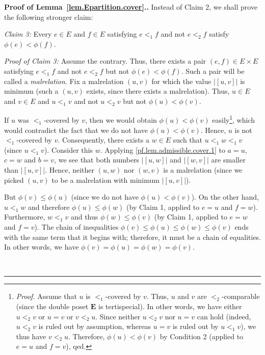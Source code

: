 \documentclass[numbers=enddot,12pt,final,onecolumn,notitlepage,abstracton]{scrartcl}
\theoremstyle{definition}
\newenvironment{proof}[1][Proof]{\noindent\textbf{#1.} }{\ \rule{0.5em}{0.5em}}
\newcommand{\EE}{{\mathbf{E}}}
\begin{document}
\begin{proof}[Proof of Lemma~\ref{lem.Epartition.cover}.]
Instead of Claim 2, we shall prove the following stronger claim:

\textit{Claim 3:} Every $e \in E$ and $f \in E$ satisfying
$e <_1 f$ and not $e <_2 f$ satisfy
$\phi\left(e\right) < \phi\left(f\right)$.

\textit{Proof of Claim 3:} Assume the contrary. Thus, there
exists a pair $\left(e, f\right) \in E \times E$ satisfying
$e <_1 f$ and not $e <_2 f$ but not
$\phi\left(e\right) < \phi\left(f\right)$.
Such a pair will be called a \textit{malrelation}. Fix a
malrelation $\left(u, v\right)$ for which the value
$\left|\left[u, v\right]\right|$ is minimum (such a
$\left(u, v\right)$ exists, since there exists a malrelation).
Thus, $u \in E$ and $v \in E$ and $u <_1 v$ and not $u <_2 v$
but not $\phi\left(u\right) < \phi\left(v\right)$.

If $u$ was $<_1$-covered by $v$, then we would obtain
$\phi\left(u\right) < \phi\left(v\right)$
easily\footnote{\textit{Proof.} Assume that $u$ is
$<_1$-covered by $v$. Thus, $u$ and $v$ are $<_2$-comparable
(since the double poset $\EE$ is tertispecial). In other words,
we have either $u <_2 v$ or $u = v$ or $v <_2 u$. Since
neither $u <_2 v$ nor $u = v$ can hold (indeed, $u <_2 v$
is ruled out by assumption, whereas $u = v$ is ruled out by
$u <_1 v$), we thus have $v <_2 u$. Therefore,
$\phi\left(u\right) < \phi\left(v\right)$
by Condition 2 (applied to $e = u$ and $f = v$), qed.}, which
would contradict the fact that we do not have
$\phi\left(u\right) < \phi\left(v\right)$. Hence, $u$ is not
$<_1$-covered by $v$. Consequently, there exists a $w \in E$
such that $u <_1 w <_1 v$ (since $u <_1 v$). Consider this
$w$. Applying \eqref{pf.lem.admissible.cover.1} to $a = u$,
$c = w$ and $b = v$, we see that both numbers
$\left|\left[u, w\right]\right|$ and
$\left|\left[w, v\right]\right|$ are smaller than
$\left|\left[u, v\right]\right|$. Hence, neither
$\left(u, w\right)$ nor $\left(w, v\right)$ is a malrelation
(since we picked $\left(u, v\right)$ to be a malrelation with
minimum $\left|\left[u, v\right]\right|$).

But $\phi\left(v\right) \leq \phi\left(u\right)$ (since we do
not have $\phi\left(u\right) < \phi\left(v\right)$). On the
other hand, $u <_1 w$ and therefore $\phi\left(u\right) \leq
\phi\left(w\right)$ (by Claim 1, applied to $e = u$ and
$f = w$). Furthermore, $w <_1 v$ and
thus $\phi\left(w\right) \leq \phi\left(v\right)$ (by Claim 1,
applied to $e = w$ and $f = v$).
The chain of inequalities
$\phi\left(v\right) \leq \phi\left(u\right)
\leq \phi\left(w\right) \leq \phi\left(v\right)$ ends with
the same term that it begins with; therefore, it must be a chain
of equalities. In other words, we have
$\phi\left(v\right) = \phi\left(u\right)
= \phi\left(w\right) = \phi\left(v\right)$.


\end{proof}
\end{document}
